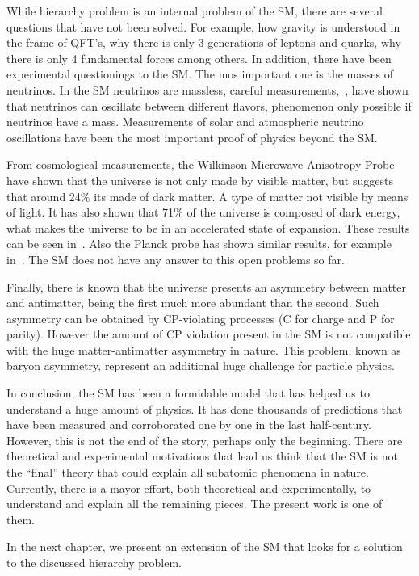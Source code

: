 While hierarchy problem is an internal problem of the SM, there are several questions that have not been solved. For example, how gravity is understood in the frame of QFT's, why there is only 3 generations of leptons and quarks, why there is only 4 fundamental forces among others. In addition, there have been experimental questionings to the SM. The mos important one is the masses of neutrinos. In the SM neutrinos are massless, careful measurements,~\cite{Ashie:2004mr, Weinheimer:2013hya}, have shown that neutrinos can oscillate between different flavors, phenomenon only possible if neutrinos have a mass. Measurements of solar and atmospheric neutrino oscillations have been the most important proof of physics beyond the SM. 

From cosmological measurements, the Wilkinson Microwave Anisotropy Probe have shown that the universe is not only made by visible matter, but suggests that around 24\% its made of dark matter. A type of matter not visible by means of light. It has also shown that 71\% of the universe is composed of dark energy, what makes the universe to be in an accelerated state of expansion. These results can be seen in~\cite{2013ApJS..208...20B, 2013ApJS..208...19H}. Also the Planck probe has shown similar results, for example in~\cite{Planck:2015xua}. The SM does not have any answer to this open problems so far. 

Finally, there is known that the universe presents an asymmetry between matter and antimatter, being the first much more abundant than the second. Such asymmetry can be obtained by CP-violating processes (C for charge and P for parity). However the amount of CP violation present in the SM is not compatible with the huge matter-antimatter asymmetry in nature. This problem, known as baryon asymmetry, represent an additional huge challenge for particle physics. 

In conclusion, the SM has been a formidable model that has helped us to understand a huge amount of physics. It has done thousands of predictions that have been measured and corroborated one by one in the last half-century. However, this is not the end of the story, perhaps only the beginning. There are theoretical and experimental motivations that lead us think that the SM is not the ``final'' theory that could explain all subatomic phenomena in nature. Currently, there is a mayor effort, both theoretical and experimentally, to understand and explain all the remaining pieces. The present work is one of them.

In the next chapter, we present an extension of the SM that looks for a solution to the discussed hierarchy problem.